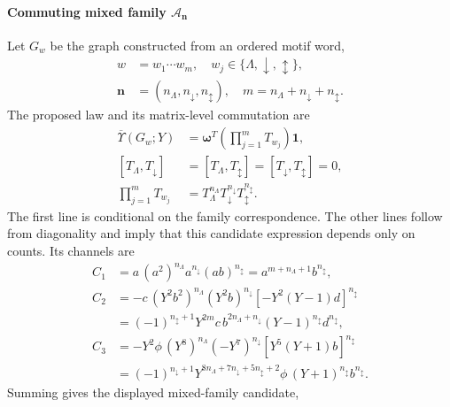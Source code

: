 \paragraph{Commuting mixed family $\mathcal A_{\mathbf n}$}
\label{supp:transfer_abelian_mixed}
Let $G_w$ be the graph constructed from an ordered motif word,
\begin{equation}
\begin{aligned}
w&=w_1\cdots w_m,\quad w_j\in\{\Lambda,\downarrow,\updownarrow\},\\
\mathbf n&=(n_\Lambda,n_\downarrow,n_\updownarrow),\quad m=n_\Lambda+n_\downarrow+n_\updownarrow.
\end{aligned}
\label{supp:deriv:eq:mixed_word_counts}
\end{equation}
The proposed law and its matrix-level commutation are
\begin{equation}
\begin{aligned}
\overline{\Upsilon}(G_w;Y)&=\bm\omega^T\!\left(\prod_{j=1}^mT_{w_j}\right)\!\bm1,\\
[T_\Lambda,T_\downarrow]&=[T_\Lambda,T_\updownarrow]=[T_\downarrow,T_\updownarrow]=0,\\
\prod_{j=1}^mT_{w_j}&=T_\Lambda^{n_\Lambda}T_\downarrow^{n_\downarrow}T_\updownarrow^{n_\updownarrow}.
\end{aligned}
\label{supp:deriv:eq:mixed_commuting_transfer}
\end{equation}
The first line is conditional on the family correspondence. The other lines follow from diagonality and imply that this candidate expression depends only on counts. Its channels are
\begin{equation}
\begin{aligned}
C_1&=a\,(a^2)^{n_\Lambda}a^{n_\downarrow}(ab)^{n_\updownarrow}
=a^{m+n_\Lambda+1}b^{n_\updownarrow},\\
C_2&=-c\,(Y^2b^2)^{n_\Lambda}(Y^2b)^{n_\downarrow}[-Y^2(Y-1)d]^{n_\updownarrow}\\
&=(-1)^{n_\updownarrow+1}Y^{2m}c\,b^{2n_\Lambda+n_\downarrow}(Y-1)^{n_\updownarrow}d^{n_\updownarrow},\\
C_3&=-Y^2\phi\,(Y^8)^{n_\Lambda}(-Y^7)^{n_\downarrow}[Y^5(Y+1)b]^{n_\updownarrow}\\
&=(-1)^{n_\downarrow+1}Y^{8n_\Lambda+7n_\downarrow+5n_\updownarrow+2}\phi\,(Y+1)^{n_\updownarrow}b^{n_\updownarrow}.
\end{aligned}
\label{supp:deriv:eq:mixed_channels}
\end{equation}
Summing gives the displayed mixed-family candidate,
